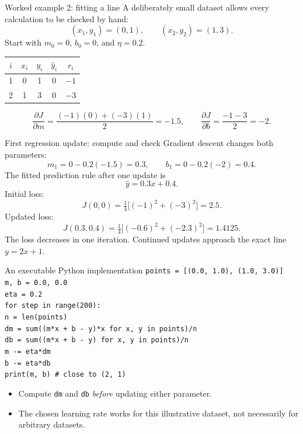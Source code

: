 \documentclass[aspectratio=169,11pt]{beamer}
\begin{document}
\begin{frame}{Worked example 2: fitting a line}
A deliberately small dataset allows every calculation to be checked by hand:
\[
(x_1,y_1)=(0,1),\qquad (x_2,y_2)=(1,3).
\]
Start with $m_0=0$, $b_0=0$, and $\eta=0.2$.
\begin{center}
\begin{tabular}{ccccc}
\toprule
$i$ & $x_i$ & $y_i$ & $\widehat y_i$ & $r_i$\\
\midrule
1 & 0 & 1 & 0 & $-1$\\
2 & 1 & 3 & 0 & $-3$\\
\bottomrule
\end{tabular}
\end{center}
\[
\frac{\partial J}{\partial m}=\frac{(-1)(0)+(-3)(1)}{2}=-1.5,
\qquad \frac{\partial J}{\partial b}=\frac{-1-3}{2}=-2.
\]
\end{frame}

\begin{frame}{First regression update: compute and check}
Gradient descent changes both parameters:
\[
m_1=0-0.2(-1.5)=0.3,\qquad b_1=0-0.2(-2)=0.4.
\]
The fitted prediction rule after one update is
\[\boxed{\widehat y=0.3x+0.4}.\]
Initial loss:
\[
J(0,0)=\tfrac14\big[(-1)^2+(-3)^2\big]=2.5.
\]
Updated loss:
\[
J(0.3,0.4)=\tfrac14\big[(-0.6)^2+(-2.3)^2\big]=1.4125.
\]
The loss decreases in one iteration. Continued updates approach the exact line $y=2x+1$.
\end{frame}

\begin{frame}{An executable Python implementation}
\small
\texttt{points = [(0.0, 1.0), (1.0, 3.0)]}\\
\texttt{m, b = 0.0, 0.0}\\
\texttt{eta = 0.2}\\[5pt]
\texttt{for step in range(200):}\\
\hspace*{1.4em}\texttt{n = len(points)}\\
\hspace*{1.4em}\texttt{dm = sum((m*x + b - y)*x for x, y in points)/n}\\
\hspace*{1.4em}\texttt{db = sum((m*x + b - y) for x, y in points)/n}\\
\hspace*{1.4em}\texttt{m -= eta*dm}\\
\hspace*{1.4em}\texttt{b -= eta*db}\\[7pt]
\texttt{print(m, b)  \# close to (2, 1)}
\vspace{0.5cm}
\begin{itemize}
\item Compute \texttt{dm} and \texttt{db} \emph{before} updating either parameter.
\item The chosen learning rate works for this illustrative dataset, not necessarily for arbitrary datasets.
\end{itemize}
\end{frame}
\end{document}
